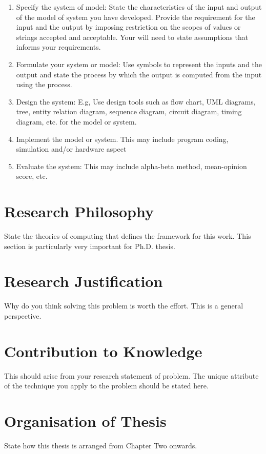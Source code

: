 \begin{enumerate}
\item Specify the system of model: State the characteristics of the input and output of the model of system you have developed. Provide the requirement for the input and the output by imposing restriction on the scopes of values or strings accepted and acceptable. Your will need to state assumptions that informs your requirements. \vspace*{-4mm}

\item Formulate your system or model: Use symbols to represent the inputs and the output and state the process by which the output is computed from the input using the process. \vspace*{-4mm}

\item Design the system: E.g, Use design tools such as flow chart, UML diagrams, tree, entity relation diagram, sequence diagram, circuit diagram, timing diagram, etc. for the model or system. \vspace*{-4mm}

\item Implement the model or system. This may include program coding, simulation and/or hardware aspect \vspace*{-4mm}

\item Evaluate the system: This may include alpha-beta method, mean-opinion score, etc. 
\end{enumerate} 

\section{Research Philosophy}

State the theories of computing that defines the framework for this work. This section is particularly very important for Ph.D. thesis.


\section{Research Justification}

Why do you think solving this problem is worth the effort. This is a general perspective.

\section{Contribution to Knowledge} 

This should arise from your research statement of problem. The unique attribute of the technique you apply to the problem should be stated here. 

\section{Organisation of Thesis}

State how this thesis is arranged from Chapter Two onwards.  